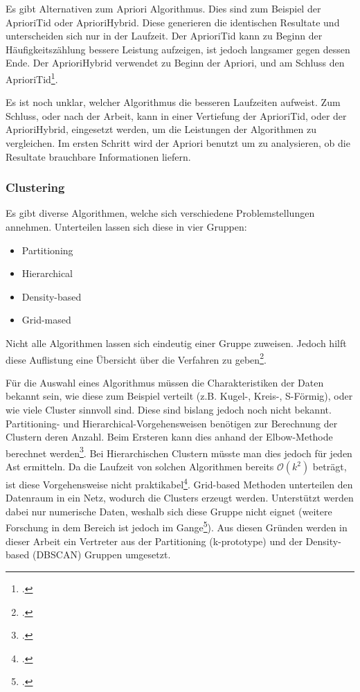 Es gibt Alternativen zum Apriori Algorithmus. Dies sind zum Beispiel der AprioriTid oder AprioriHybrid. Diese generieren die identischen Resultate und unterscheiden sich nur in der Laufzeit. Der AprioriTid kann zu Beginn der Häufigkeitszählung bessere Leistung aufzeigen, ist jedoch langsamer gegen dessen Ende. Der AprioriHybrid verwendet zu Beginn der Apriori, und am Schluss den AprioriTid\footcite{association_rule_learning_2017-01-05}. 

Es ist noch unklar, welcher Algorithmus die besseren Laufzeiten aufweist. Zum Schluss, oder nach der Arbeit, kann in einer Vertiefung der AprioriTid, oder der AprioriHybrid, eingesetzt werden, um die Leistungen der Algorithmen zu vergleichen. Im ersten Schritt wird der Apriori benutzt um zu analysieren, ob die Resultate brauchbare Informationen liefern.

\subsubsection{Clustering}
\label{sec:konzept:algorithmenauswahl:clustering}
Es gibt diverse Algorithmen, welche sich verschiedene Problemstellungen annehmen. Unterteilen lassen sich diese in vier Gruppen:
\begin{itemize}
	\item Partitioning
	\item Hierarchical
	\item Density-based
	\item Grid-mased
\end{itemize}
Nicht alle Algorithmen lassen sich eindeutig einer Gruppe zuweisen. Jedoch hilft diese Auflistung eine Übersicht über die Verfahren zu geben\footcite{data_mining_concepts_and_techniques}.

Für die Auswahl eines Algorithmus müssen die Charakteristiken der Daten bekannt sein, wie diese zum Beispiel verteilt (z.B. Kugel-, Kreis-, S-Förmig), oder wie viele Cluster sinnvoll sind. Diese sind bislang jedoch noch nicht bekannt.
Partitioning- und Hierarchical-Vorgehensweisen benötigen zur Berechnung der Clustern deren Anzahl. Beim Ersteren kann dies anhand der Elbow-Methode berechnet werden\footcite{elbow_method}. Bei Hierarchischen Clustern müsste man dies jedoch für jeden Ast ermitteln. Da die Laufzeit von solchen Algorithmen bereits $\mathcal{O}(k^2)$ beträgt, ist diese Vorgehensweise nicht praktikabel\footcite{complexity_hierarchical_clustering}. Grid-based Methoden unterteilen den Datenraum in ein Netz, wodurch die Clusters erzeugt werden. Unterstützt werden dabei nur numerische Daten, weshalb sich diese Gruppe nicht eignet (weitere Forschung in dem Bereich ist jedoch im Gange\footcite{sting_categorical_data}).
Aus diesen Gründen werden in dieser Arbeit ein Vertreter aus der Partitioning (k-prototype) und der Density-based (DBSCAN) Gruppen umgesetzt.

